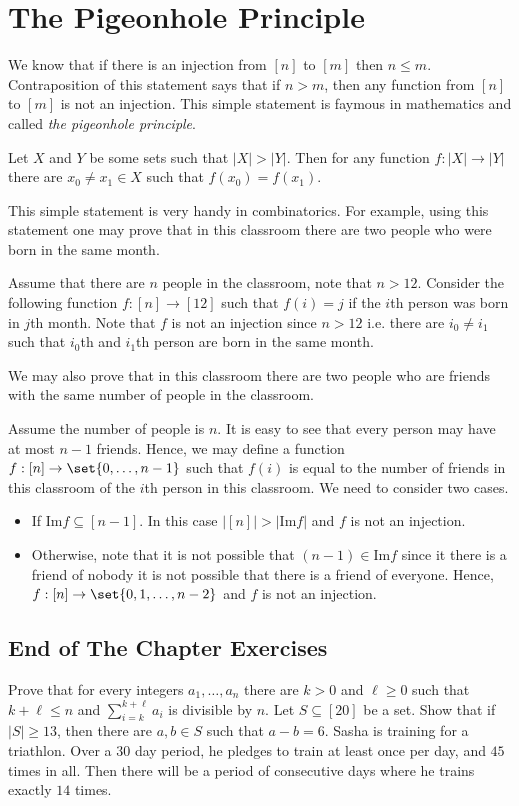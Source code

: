 \chapter{The Pigeonhole Principle}
We know that if there is an injection from $[n]$ to $[m]$ then $n \le m$.
Contraposition of this statement says that if $n > m$, then any function from
$[n]$ to $[m]$ is not an injection. This simple statement is faymous in
mathematics and called \textit{the pigeonhole principle}.

\begin{theorem}
  Let $X$ and $Y$ be some sets such that $|X| > |Y|$. Then for any function
  $f : |X| \to |Y|$ there are $x_0 \neq x_1 \in X$ such that $f(x_0) = f(x_1)$.
\end{theorem}

This simple statement is very handy in combinatorics. For example, using this
statement one may prove that in this classroom there are two people who were
born in the same month.

Assume that there are $n$ people in the classroom, note that $n > 12$.
Consider the following function $f : [n] \to [12]$ such that $f(i) = j$ if the
$i$th person was born in $j$th month. Note that $f$ is not an injection since
$n > 12$ i.e. there are $i_0 \neq i_1$ such that $i_0$th and $i_1$th person are
born in the same month.

We may also prove that in this classroom there are two people who are
friends with the same number of people in the classroom.

Assume the number of people is $n$. It is easy to see that every person may
have at most $n - 1$ friends. Hence, we may define a function $f: [n] \to \set{0, \dots, n - 1}$ such that $f(i)$ is equal to the number of friends in this
classroom of the $i$th person in this classroom.
We need to consider two cases.
\begin{itemize}
  \item If $\mathrm{Im}f \subseteq [n - 1]$. In this case
    $|[n]| > |\mathrm{Im}f|$ and $f$ is not an injection.
  \item Otherwise, note that it is not possible that $(n - 1) \in \mathrm{Im}f$
    since it there is a friend of nobody it is not possible that there is a
    friend of everyone. Hence, $f : [n] \to \set{0, 1, \dots, n - 2}$ and $f$ is
    not an injection.
\end{itemize}

\section*{End of The Chapter Exercises}
\begin{exercises}
  \exerciseitem Prove that for every integers $a_1, \dots, a_n$ there are
    $k > 0$ and $\ell \ge 0$ such that $k + \ell \le n$ and
    $\sum\limits_{i = k}^{k + \ell} a_i$ is divisible by $n$.
  \exerciseitem Let $S \subseteq [20]$ be a set. Show that if
    $|S| \ge 13$, then there are $a, b \in S$ such that $a - b = 6$.
  \exerciseitem Sasha is training for a triathlon. Over a $30$ day period, he
    pledges to train at least once per day, and $45$ times in all. Then there
    will be a period of consecutive days where he trains exactly $14$ times.
\end{exercises}
